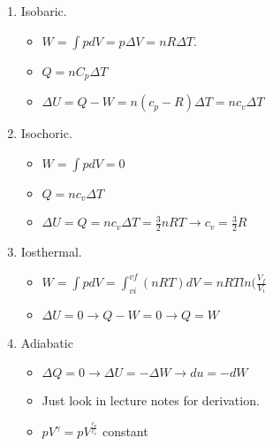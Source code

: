 \documentclass{article}
\begin{document}
\begin{enumerate}
\item Isobaric.
    \begin{itemize}
    \item $W = \int p dV = p \Delta V = nR \Delta T$.
    \item $Q = n C_p \Delta T$
    \item $\Delta U = Q - W = n(c_p - R) \Delta T= n c_v \Delta T$
    \end{itemize}
\item Isochoric.
    \begin{itemize}
    \item $W = \int p dV = 0$
    \item $Q = n c_v \Delta T$
    \item $\Delta U = Q = n c_v \Delta T = \frac{3}{2} n RT \rightarrow c_v = \frac{3}{2}R$
    \end{itemize}
\item Iosthermal.
    \begin{itemize}
    \item $W = \int p dV = \int _{vi} ^{vf} (nRT) dV = nRT ln(\frac{V_f}{V_i}$
    \item $\Delta U = 0 \rightarrow Q - W = 0 \rightarrow Q = W$
    \end{itemize}
\item Adiabatic
    \begin{itemize}
    \item $\Delta Q = 0 \rightarrow \Delta U = - \Delta W \rightarrow du = -dW$
    \item Just look in lecture notes for derivation.
    \item $pV^{\gamma} = pV^{\frac{c_p}{c_v}}$ constant
    \end{itemize}
\end{enumerate}
\end{document}

